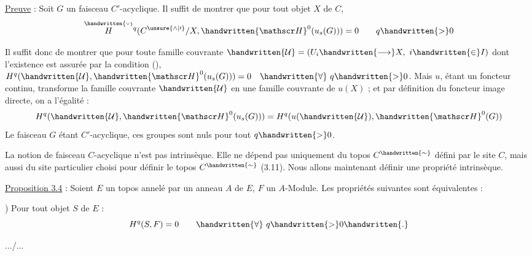 \uline{Preuve} : Soit $G$ un faisceau $C'$-acyclique. Il suffit de montrer que pour tout objet $X$ de $C$,
\[
 \overset{\handwritten{\scriptscriptstyle\vee}}{H}{}^q(C^{\unsure{\wedge|\prime}}/X,\handwritten{\mathscr H}^{0}(u_s(G)))=0
 \qquad q\handwritten{>}0
\]

Il suffit donc de montrer que pour toute famille couvrante $\handwritten{\mathcal U}=(U_i\handwritten{\longrightarrow}X,\ i\handwritten{\in}I)$ dont l'existence est assurée par la condition (), $H^q(\handwritten{\mathcal U},\handwritten{\mathscr H}^{0}(u_s(G)))=0\quad\handwritten{\forall}\ q\handwritten{>}0$. Mais $u$, étant un foncteur continu, transforme la famille couvrante $\handwritten{\mathcal U}$ en une famille couvrante de $u(X)$ ; et par définition du foncteur image directe, on a l'égalité :
\[
 H^q(\handwritten{\mathcal U},\handwritten{\mathscr H}^{0}(u_s(G))) =
 H^q(u(\handwritten{\mathcal U}),\handwritten{\mathscr H}^{0}(G))
\]
Le faisceau $G$ étant $C'$-acyclique, ces groupes sont nuls pour tout $q\handwritten{>}0$. 

La notion de faisceau $C$-acyclique n'est pas intrinsèque. Elle ne dépend pas uniquement du topos $C^{\handwritten{\sim}}$ défini par le site $C$, mais aussi du site particulier choisi pour définir le topos $C^{\handwritten{\sim}}$ (3.11). Nous allons maintenant définir une propriété intrinsèque.

\uline{Proposition 3.4} : Soient $E$ un topos annelé par un anneau $A$ de $E$, $F$ un $A$-Module. Les propriétés suivantes sont équivalentes :

) Pour tout objet $S$ de $E$ :
\[
 H^q(S,F)=0 \qquad \handwritten{\forall}\ q\handwritten{>}0\handwritten{.}
\]

\hfill .../...

